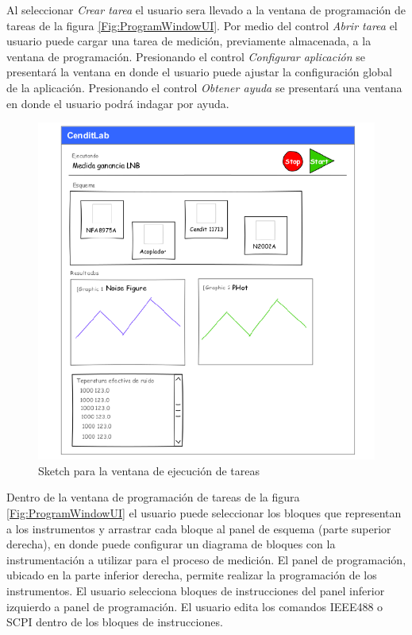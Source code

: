 \documentclass[paper=a4,oneside,fontsize=12pt]{article}
\begin{document}
	Al seleccionar \emph{Crear tarea} el usuario sera llevado a la ventana de programación de tareas de la figura \ref{Fig:ProgramWindowUI}. Por medio del control \emph{Abrir tarea} el usuario puede cargar una tarea de medición, previamente almacenada, a la ventana de programación. Presionando el control \emph{Configurar aplicación} se presentará la ventana en donde el usuario puede ajustar la configuración global de la aplicación. Presionando el control \emph{Obtener ayuda} se presentará una ventana en donde el usuario podrá indagar por ayuda.

	\begin{figure}[H]
		\centering 
		\includegraphics[width=12cm]{Imagenes/ExecutionWindowUI.pdf}
		\caption{Sketch para la ventana de ejecución de tareas}
		\label{Fig:ExecutionWindowUI} 		
	\end{figure}

	Dentro de la ventana de programación de tareas de la figura \ref{Fig:ProgramWindowUI} el usuario puede seleccionar los bloques que representan a los instrumentos y arrastrar cada bloque al panel de esquema (parte superior derecha), en donde puede configurar un diagrama de bloques con la instrumentación a utilizar para el proceso de medición. El panel de programación,  ubicado en la parte inferior derecha, permite realizar la programación de los instrumentos. El usuario selecciona bloques de instrucciones del panel inferior izquierdo a panel de programación. El usuario edita los comandos IEEE488 o SCPI dentro de los bloques de instrucciones. 
\end{document}
